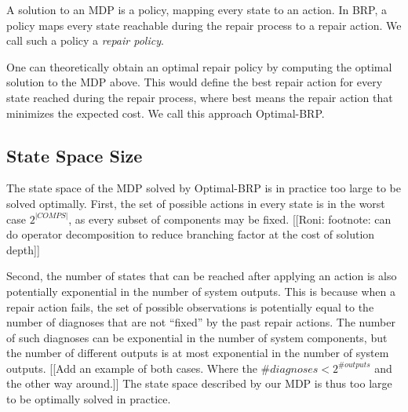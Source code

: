 A solution to an MDP is a policy, mapping every state to an action. In BRP, a policy maps every state reachable during the repair process to a repair action. We call such a policy a {\em repair policy}.

One can theoretically obtain an optimal repair policy by computing the optimal solution to the MDP above. This would define the best repair action for every state reached during the repair process, where best means the repair action that minimizes the expected cost. We call this approach Optimal-BRP.

\subsection{State Space Size}
The state space of the MDP solved by Optimal-BRP is in practice too large to be solved optimally. First, the set of possible actions in every state is in the worst case $2^{|COMPS|}$, as every subset of components may be fixed. [[Roni: footnote: can do operator decomposition to reduce branching factor at the cost of solution depth]]

Second, the number of states that can be reached after applying an action is also potentially exponential in the number of system outputs. This is because when a repair action fails, the set of possible observations is potentially equal to the number of diagnoses that are not ``fixed'' by the past repair actions. The number of such diagnoses can be exponential in the number of system components, but the number of different outputs is at most exponential in the number of system outputs.
[[Add an example of both cases. Where the $\#diagnoses < 2^{\#outputs}$ and the other way around.]]
The state space described by our MDP is thus too large to be optimally solved in practice.
